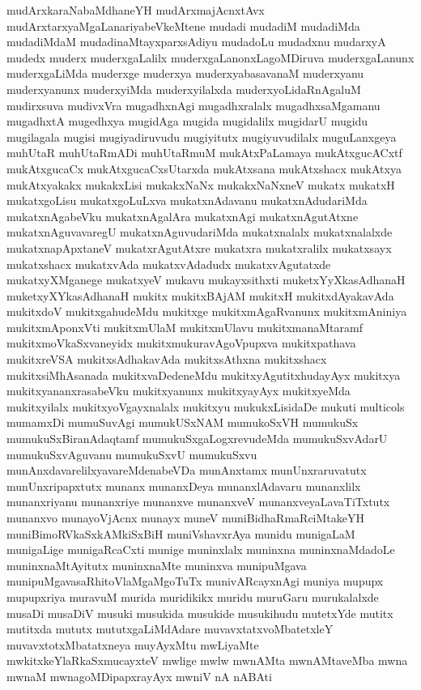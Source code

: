 {mudArxkaraNabaMdhaneYH
mudArxmajAcnxtAvx
mudArxtarxyaMgaLanariyabeVkeMtene
mudadi
mudadiM
mudadiMda
mudadiMdaM
mudadinaMtayxparxsAdiyu
mudadoLu
mudadxnu
mudarxyA
mudedx
muderx
muderxgaLalilx
muderxgaLanonxLagoMDiruva
muderxgaLanunx
muderxgaLiMda
muderxge
muderxya
muderxyabasavanaM
muderxyanu
muderxyanunx
muderxyiMda
muderxyilalxda
muderxyoLidaRnAgaluM
mudirxsuva
mudivxVra
mugadhxnAgi
mugadhxralalx
mugadhxsaMgamanu
mugadhxtA
mugedhxya
mugidAga
mugida
mugidalilx
mugidarU
mugidu
mugilagala
mugisi
mugiyadiruvudu
mugiyitutx
mugiyuvudilalx
muguLanxgeya
muhUtaR
muhUtaRmADi
muhUtaRmuM
mukAtxPaLamaya
mukAtxgucACxtf
mukAtxgucaCx
mukAtxgucaCxsUtarxda
mukAtxsana
mukAtxshacx
mukAtxya
mukAtxyakakx
mukakxLisi
mukakxNaNx
mukakxNaNxneV
mukatx
mukatxH
mukatxgoLisu
mukatxgoLuLxva
mukatxnAdavanu
mukatxnAdudariMda
mukatxnAgabeVku
mukatxnAgalAra
mukatxnAgi
mukatxnAgutAtxne
mukatxnAguvavaregU
mukatxnAguvudariMda
mukatxnalalx
mukatxnalalxde
mukatxnapApxtaneV
mukatxrAgutAtxre
mukatxra
mukatxralilx
mukatxsayx
mukatxshacx
mukatxvAda
mukatxvAdadudx
mukatxvAgutatxde
mukatxyXMganege
mukatxyeV
mukavu
mukayxsithxti
muketxYyXkasAdhanaH
muketxyXYkasAdhanaH
mukitx
mukitxBAjAM
mukitxH
mukitxdAyakavAda
mukitxdoV
mukitxgahudeMdu
mukitxge
mukitxmAgaRvanunx
mukitxmAniniya
mukitxmAponxVti
mukitxmUlaM
mukitxmUlavu
mukitxmanaMtaramf
mukitxmoVkaSxvaneyidx
mukitxmukuravAgoVpupxva
mukitxpathava
mukitxreVSA
mukitxsAdhakavAda
mukitxsAthxna
mukitxshacx
mukitxsiMhAsanada
mukitxvaDedeneMdu
mukitxyAgutitxhudayAyx
mukitxya
mukitxyananxrasabeVku
mukitxyanunx
mukitxyayAyx
mukitxyeMda
mukitxyilalx
mukitxyoVgayxnalalx
mukitxyu
mukukxLisidaDe
mukuti
multicols
mumamxDi
mumuSuvAgi
mumukUSxNAM
mumukoSxVH
mumukuSx
mumukuSxBiranAdaqtamf
mumukuSxgaLogxrevudeMda
mumukuSxvAdarU
mumukuSxvAguvanu
mumukuSxvU
mumukuSxvu
munAnxdavarelilxyavareMdenabeVDa
munAnxtamx
munUnxraruvatutx
munUnxripapxtutx
munanx
munanxDeya
munanxlAdavaru
munanxlilx
munanxriyanu
munanxriye
munanxve
munanxveV
munanxveyaLavaTiTxtutx
munanxvo
munayoVjAcnx
munayx
muneV
muniBidhaRmaRciMtakeYH
muniBimoRVkaSxkAMkiSxBiH
muniVshavxrAya
munidu
munigaLaM
munigaLige
munigaRcaCxti
munige
muninxlalx
muninxna
muninxnaMdadoLe
muninxnaMtAyitutx
muninxnaMte
muninxva
munipuMgava
munipuMgavasaRhitoVlaMgaMgoTuTx
munivARcayxnAgi
muniya
mupupx
mupupxriya
muravuM
murida
muridikikx
muridu
muruGaru
murukalalxde
musaDi
musaDiV
musuki
musukida
musukide
musukihudu
mutetxYde
mutitx
mutitxda
mututx
mututxgaLiMdAdare
muvavxtatxvoMbatetxleY
muvavxtotxMbatatxneya
muyAyxMtu
mwLiyaMte
mwkitxkeYlaRkaSxmucayxteV
mwlige
mwlw
mwnAMta
mwnAMtaveMba
mwna
mwnaM
mwnagoMDipapxrayAyx
mwniV
nA
nABAti
}
